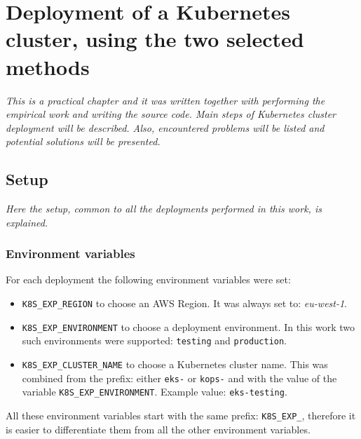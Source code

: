 \section{Deployment of a Kubernetes cluster, using the two selected methods}
\textit{This is a practical chapter and it was written together with performing the empirical work and writing the source code. Main steps of Kubernetes cluster deployment will be described. Also, encountered problems will be listed and potential solutions will be presented.}
\\

\subsection{Setup}
\textit{Here the setup, common to all the deployments performed in this work, is explained.}
\\

\subsubsection{Environment variables}
For each deployment the following environment variables were set:
\begin{itemize}
\item \verb|K8S_EXP_REGION| to choose an AWS Region. It was always set to: \textit{eu-west-1}.
\item \verb|K8S_EXP_ENVIRONMENT| to choose a deployment environment. In this work two such environments were supported: \verb|testing| and \verb|production|.
\item \verb|K8S_EXP_CLUSTER_NAME| to choose a Kubernetes cluster name. This was combined from the prefix: either \verb|eks-| or \verb|kops-| and with the value of the variable \verb|K8S_EXP_ENVIRONMENT|. Example value: \verb|eks-testing|.
\end{itemize}

All these environment variables start with the same prefix: \verb|K8S_EXP_|, therefore it is easier to differentiate them from all the other environment variables.

